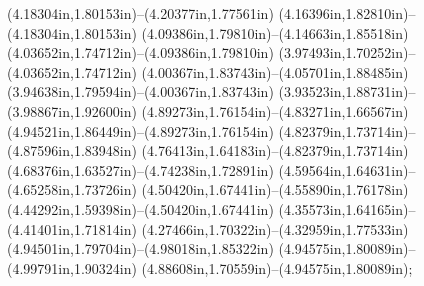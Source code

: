 (4.18304in,1.80153in)--(4.20377in,1.77561in) (4.16396in,1.82810in)--(4.18304in,1.80153in) (4.09386in,1.79810in)--(4.14663in,1.85518in) (4.03652in,1.74712in)--(4.09386in,1.79810in) (3.97493in,1.70252in)--(4.03652in,1.74712in) (4.00367in,1.83743in)--(4.05701in,1.88485in) (3.94638in,1.79594in)--(4.00367in,1.83743in) (3.93523in,1.88731in)--(3.98867in,1.92600in) (4.89273in,1.76154in)--(4.83271in,1.66567in) (4.94521in,1.86449in)--(4.89273in,1.76154in) (4.82379in,1.73714in)--(4.87596in,1.83948in) (4.76413in,1.64183in)--(4.82379in,1.73714in) (4.68376in,1.63527in)--(4.74238in,1.72891in) (4.59564in,1.64631in)--(4.65258in,1.73726in) (4.50420in,1.67441in)--(4.55890in,1.76178in) (4.44292in,1.59398in)--(4.50420in,1.67441in) (4.35573in,1.64165in)--(4.41401in,1.71814in) (4.27466in,1.70322in)--(4.32959in,1.77533in) (4.94501in,1.79704in)--(4.98018in,1.85322in) (4.94575in,1.80089in)--(4.99791in,1.90324in) (4.88608in,1.70559in)--(4.94575in,1.80089in);
